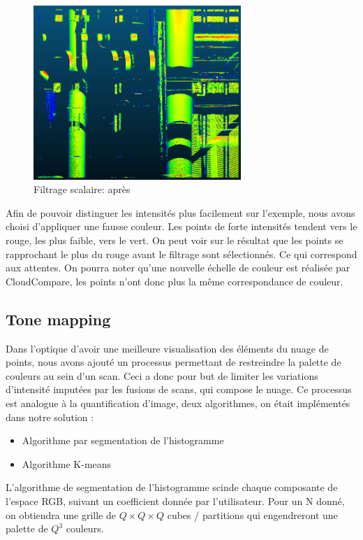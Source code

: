 \documentclass[12pt,titlepage,french]{article}
\begin{document}
\begin{figure}[H]
\center
\includegraphics[width=0.7\textwidth]{./img/scalar_apres.png}
\caption{\label{} Filtrage scalaire: après}
\end{figure}

Afin de pouvoir distinguer les intensités plus facilement sur l'exemple, nous avons choisi d'appliquer une fausse couleur. Les points de forte intensités tendent vers le rouge, les plus faible, vers le vert. On peut voir sur le résultat que les points se rapprochant le plus du rouge avant le filtrage sont sélectionnés. Ce qui correspond aux attentes. On pourra noter qu'une nouvelle échelle de couleur est réalisée par CloudCompare, les points n'ont donc plus la même correspondance de couleur.

\subsection{Tone mapping}

Dans l'optique d'avoir une meilleure visualisation des éléments du nuage de points, nous avons ajouté un processus permettant de restreindre la palette de couleurs au sein d'un scan. Ceci a donc pour but de limiter les variations d'intensité imputées par les fusions de scans, qui compose le nuage. Ce processus est analogue à la quantification d'image, deux algorithmes, on était implémentés dans notre solution :

\begin{itemize}
    \item Algorithme par segmentation de l'histogramme
    \item Algorithme K-means
\end{itemize}

L'algorithme de segmentation de l'histogramme scinde chaque composante de l'espace RGB, suivant un coefficient donnée par l'utilisateur.
Pour un N donné, on obtiendra une grille de $Q\times Q \times Q$ cubes / partitions qui engendreront une palette de $Q^3$ couleurs.
\newline
\end{document}

